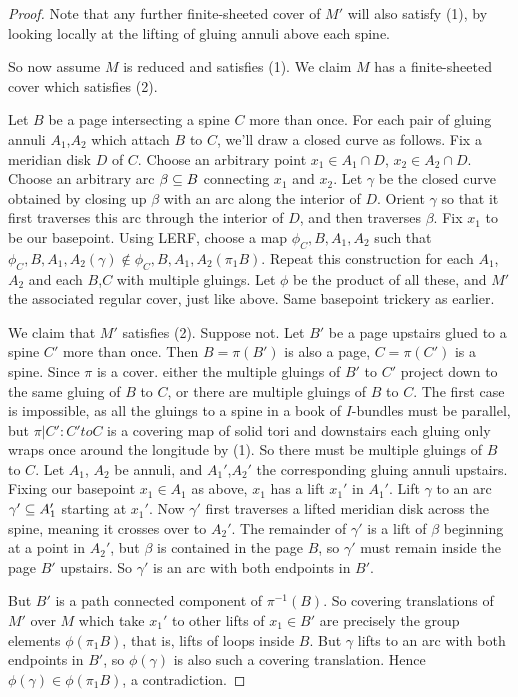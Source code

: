 \begin{proof}
Note that any further finite-sheeted cover of $M'$ will also satisfy (1), by
looking locally at the lifting of gluing annuli above each spine.

So now assume $M$ is reduced and satisfies (1). We claim $M$ has
a finite-sheeted cover which satisfies (2).

Let $B$ be a page intersecting a spine $C$ more than once. For each pair of
gluing annuli $A_1$,$A_2$ which attach $B$ to $C$, we'll draw a closed curve as
follows.  Fix a meridian disk $D$ of $C$. Choose an arbitrary point $x_1 \in
A_1 \cap D$, $x_2 \in A_2 \cap D$. Choose an arbitrary arc $\beta \subseteq B$
connecting $x_1$ and $x_2$.  Let $\gamma$ be the closed curve obtained by
closing up $\beta$ with an arc along the interior of $D$.  Orient $\gamma$ so
that it first traverses this arc through the interior of $D$, and then
traverses $\beta$.  Fix $x_1$ to be our basepoint. Using LERF, choose a map
$\phi_C,B,A_1,A_2$ such that $\phi_C,B,A_1,A_2(\gamma) \notin
\phi_C,B,A_1,A_2(\pi_1B)$. Repeat this construction for each $A_1$,$A_2$ and
each $B$,$C$ with multiple gluings. Let $\phi$ be the product of all these, and
$M'$ the associated regular cover, just like above.  Same basepoint trickery as
earlier.

We claim that $M'$ satisfies (2). Suppose not. Let $B'$ be a page upstairs
glued to a spine $C'$ more than once. Then $B=\pi(B')$ is also a page,
$C=\pi(C')$ is a spine.  Since $\pi$ is a cover. either the multiple gluings of
$B'$ to $C'$ project down to the same gluing of $B$ to $C$, or there are
multiple gluings of $B$ to $C$. The first case is impossible, as all the
gluings to a spine in a book of $I$-bundles must be parallel, but $\pi|C'
\colon C' to C$ is a covering map of solid tori and downstairs each gluing only
wraps once around the longitude by (1). So there must be multiple gluings of
$B$ to $C$.  Let $A_1$, $A_2$ be annuli, and $A_1'$,$A_2'$ the corresponding
gluing annuli upstairs.  Fixing our basepoint $x_1 \in A_1$ as above, $x_1$ has
a lift $x_1'$ in $A_1'$.  Lift $\gamma$ to an arc $\gamma' \subseteq A_1'$ starting
at $x_1'$.  Now $\gamma'$ first traverses a lifted meridian disk across the
spine, meaning it crosses over to $A_2'$. The remainder of $\gamma'$ is a lift
of $\beta$ beginning at a point in $A_2'$, but $\beta$ is contained in the page
$B$, so $\gamma'$ must remain inside the page $B'$ upstairs. So $\gamma'$ is an
arc with both endpoints in $B'$.

But $B'$ is a path connected component of $\pi^{-1}(B)$. So covering
translations of $M'$ over $M$ which take $x_1'$ to other lifts of $x_1 \in B'$
are precisely the group elements $\phi(\pi_1B)$, that is, lifts of loops inside
$B$. But $\gamma$ lifts to an arc with both endpoints in $B'$, so
$\phi(\gamma)$ is also such a covering translation.  Hence $\phi(\gamma) \in
\phi(\pi_1B)$, a contradiction.


\end{proof}
